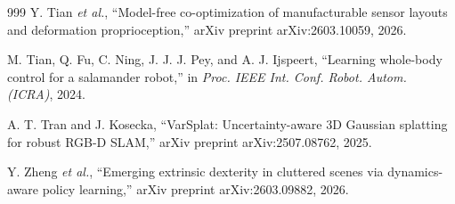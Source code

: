 \documentclass[11pt,a4paper]{article}
\begin{document}
\begin{thebibliography}{999}
Y. Tian \textit{et al.}, ``Model-free co-optimization of manufacturable sensor layouts and deformation proprioception,'' arXiv preprint arXiv:2603.10059, 2026.




M. Tian, Q. Fu, C. Ning, J. J. J. Pey, and A. J. Ijspeert, ``Learning whole-body control for a salamander robot,'' in \textit{Proc. IEEE Int. Conf. Robot. Autom. (ICRA)}, 2024.




A. T. Tran and J. Kosecka, ``{VarSplat}: Uncertainty-aware {3D} Gaussian splatting for robust {RGB-D} {SLAM},'' arXiv preprint arXiv:2507.08762, 2025.




Y. Zheng \textit{et al.}, ``Emerging extrinsic dexterity in cluttered scenes via dynamics-aware policy learning,'' arXiv preprint arXiv:2603.09882, 2026.



\end{thebibliography}
\end{document}
